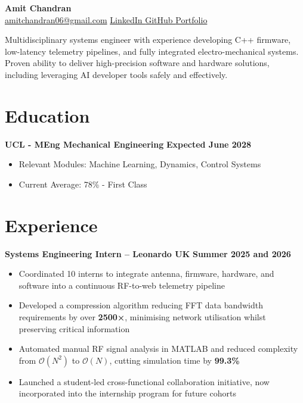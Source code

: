 \documentclass[a4paper,10pt]{article} %
\begin{document}
\pagestyle{empty}
\begin{center}
    {\huge\textbf{Amit Chandran}} \\
    \href{mailto:amitchandran06@gmail.com}{amitchandran06@gmail.com} \textbar{} \href{https://www.linkedin.com/in/amit-chandran}{LinkedIn \faLinkedinSquare} \textbar{} \href{https://github.com/amitchandran06}{GitHub \faGithub} \textbar{} \href{https://amitchandran06.github.io/Portfolio/}{Portfolio \faGlobe} \\
    \vspace{0.25cm}
    
        {\textrm{Multidisciplinary systems engineer with experience developing C++ firmware, low-latency telemetry pipelines, and fully integrated electro-mechanical systems. Proven ability to deliver high-precision software and hardware solutions, including leveraging AI developer tools safely and effectively.}}
    
\end{center}
\vspace{-0.75cm}
\section*{Education}
\noindent\textbf{UCL - MEng Mechanical Engineering} \hfill \textbf{Expected June 2028}
\begin{itemize}
    \item Relevant Modules: Machine Learning, Dynamics, Control Systems
    \item Current Average: 78\% - First Class
\end{itemize}

\vspace{-0.5cm}
\section*{Experience}
\noindent\textbf{Systems Engineering Intern – Leonardo UK} \hfill \textbf{Summer 2025 and 2026}
\begin{itemize}
    \item Coordinated 10 interns to integrate antenna, firmware, hardware, and software into a continuous RF-to-web telemetry pipeline
    \item Developed a compression algorithm reducing FFT data bandwidth requirements by over \textbf{2500×}, minimising network utilisation whilst preserving critical information
    \item Automated manual RF signal analysis in MATLAB and reduced complexity from $\mathcal{O}(N^2)$ to $\mathcal{O}(N)$, cutting simulation time by \textbf{99.3\%}
    \item Launched a student-led cross-functional collaboration initiative, now incorporated into the internship program for future cohorts
\end{itemize}
\vspace{-0.75em}
\end{document}
